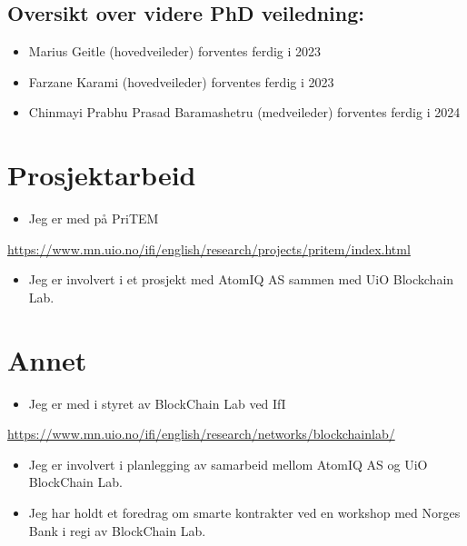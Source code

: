 \documentclass[11pt]{article}
\begin{document}
\subsection{Oversikt over videre PhD veiledning:}
\label{sec-2-5}

\begin{itemize}
\item Marius Geitle  (hovedveileder) forventes ferdig i 2023
\item Farzane Karami  (hovedveileder) forventes ferdig i 2023
\item Chinmayi Prabhu Prasad Baramashetru  (medveileder) forventes ferdig
i 2024
\end{itemize}

\section{Prosjektarbeid}
\label{sec-3}
\begin{itemize}
\item Jeg er med på PriTEM
\end{itemize}
\url{https://www.mn.uio.no/ifi/english/research/projects/pritem/index.html}

\begin{itemize}
\item Jeg er involvert i et prosjekt med AtomIQ AS sammen med UiO Blockchain Lab.
\end{itemize}

\section{Annet}
\label{sec-4}
\begin{itemize}
\item Jeg er med i styret av BlockChain Lab ved IfI
\end{itemize}
\url{https://www.mn.uio.no/ifi/english/research/networks/blockchainlab/}

\begin{itemize}
\item Jeg er involvert i planlegging av  samarbeid mellom AtomIQ AS og  UiO
BlockChain Lab.

\item Jeg  har  holdt et  foredrag om smarte kontrakter
ved en workshop med Norges Bank i regi av BlockChain Lab.
\end{itemize}
\end{document}
